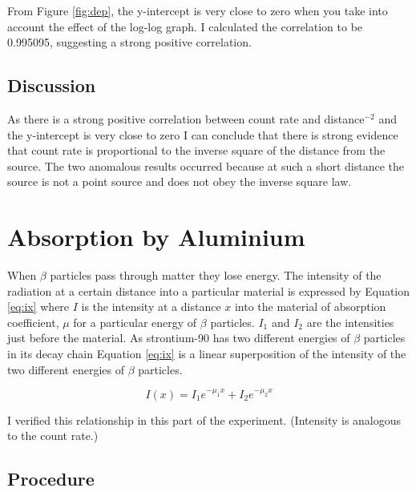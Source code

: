 \documentclass[twocolumn]{revtex4-1}
\begin{document}
From Figure \ref{fig:dep}, the y-intercept is very close to zero when you take into account the effect of the log-log graph. 
I calculated the correlation to be 0.995095, suggesting a strong positive correlation.

\vspace{-5ex}
\subsection{Discussion}
\vspace{-3ex} 

As there is a strong positive correlation between count rate and distance$^{-2}$ and the y-intercept is very close to zero I can conclude that there is strong evidence that count rate is proportional to the inverse square of the distance from the source.
The two anomalous results occurred because at such a short distance the source is not a point source and does not obey the inverse square law.

\vspace{-5ex}
\section{Absorption by Aluminium} 
\vspace{-3ex}

When $\beta$ particles pass through matter they lose energy. 
The intensity of the radiation at a certain distance into a particular material is expressed by Equation \ref{eq:ix} where $I$ is the intensity at a distance $x$ into the material of absorption coefficient, $\mu$ for a particular energy of $\beta$ particles.
$I_{1}$ and $I_{2}$ are the intensities just before the material.\cite{abs} 
As strontium-90 has two different energies of $\beta$ particles in its decay chain Equation \ref{eq:ix} is a linear superposition of the intensity of the two different energies of $\beta$ particles.

\vspace{-3ex}

\begin{equation}
I\left( x\right) =I_{1}e^{-\mu_{1} x}+I_{2}e^{-\mu_{2} x}
\label{eq:ix}
\end{equation}

I verified this relationship in this part of the experiment.
(Intensity is analogous to the count rate.)

\vspace{-4ex}
\subsection{Procedure}
\vspace{-3ex}
\end{document}
